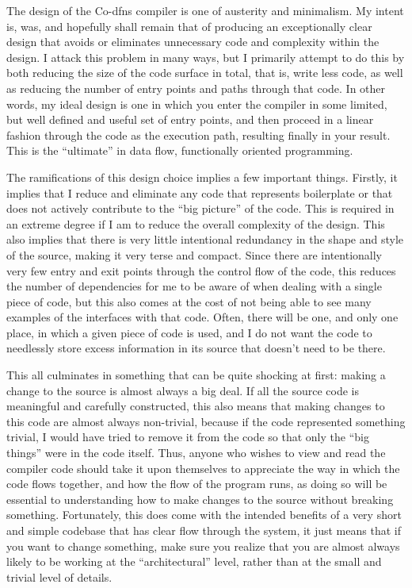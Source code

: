 \documentclass{article}%
\begin{document}
The design of the Co-dfns compiler is one of austerity and minimalism.
My intent is, was, and hopefully shall remain that of producing an 
exceptionally clear design that avoids or eliminates unnecessary 
code and complexity within the design.
I attack this problem in many ways, but I primarily attempt to do 
this by both reducing the size of the code surface in total,
that is, write less code, as well as reducing the number of entry 
points and paths through that code. 
In other words, my ideal design is one in which you enter the 
compiler in some limited, but well defined and useful set of entry 
points, and then proceed in a linear fashion through the code as the
execution path, resulting finally in your result.
This is the ``ultimate'' in data flow, functionally oriented programming.

The ramifications of this design choice implies a few important things.
Firstly, it implies that I reduce and eliminate any code
that represents boilerplate or that does not actively contribute
to the ``big picture'' of the code.
This is required in an extreme degree if I am to reduce the overall
complexity of the design.
This also implies that there is very little intentional redundancy in 
the shape and style of the source,
making it very terse and compact.
Since there are intentionally very few entry and exit points through 
the control flow of the code, 
this reduces the number of dependencies for me to be aware of when 
dealing with a single piece of code,
but this also comes at the cost of not being able to see many examples
of the interfaces with that code. 
Often, there will be one, and only one place, in which a given piece 
of code is used, and I do not want the code to needlessly store 
excess information in its source that doesn't need to be there.

This all culminates in something that can be quite shocking at first:
making a change to the source is almost always a big deal.
If all the source code is meaningful and carefully constructed,
this also means that making changes to this code are almost always 
non-trivial, because if the code represented something trivial,
I would have tried to remove it from the code so that only the 
``big things'' were in the code itself.
Thus, anyone who wishes to view and read the compiler code should
take it upon themselves to appreciate the way in which the code flows
together,
and how the flow of the program runs, 
as doing so will be essential to understanding how to make changes to 
the source without breaking something.
Fortunately, this does come with the intended benefits of a very 
short and simple codebase that has clear flow through the system,
it just means that if you want to change something, 
make sure you realize that you are almost always likely to be working
at the ``architectural'' level, rather than at the small and trivial
level of details.
\end{document}

